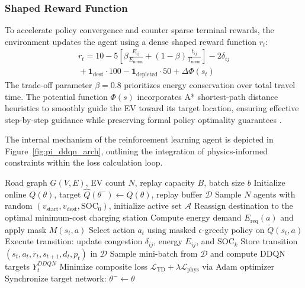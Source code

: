 \documentclass[conference]{IEEEtran}
\begin{document}
\subsubsection{Shaped Reward Function}
To accelerate policy convergence and counter sparse terminal rewards, the environment updates the agent using a dense shaped reward function $r_t$:
\begin{equation}
\begin{aligned}
r_t = 10 - 5\left[\beta\frac{E_{ij}}{E_{\text{norm}}} + (1-\beta)\frac{t_{ij}}{T_{\text{norm}}}\right] - 2\delta_{ij} \\
{} + \mathbf{1}_{\text{dest}}\cdot 100 - \mathbf{1}_{\text{depleted}}\cdot 50 + \Delta\Phi(s_t)
\end{aligned}
\label{eq:reward}
\end{equation}
The trade-off parameter $\beta = 0.8$ prioritizes energy conservation over total travel time. The potential function $\Phi(s)$ incorporates A* shortest-path distance heuristics to smoothly guide the EV toward its target location, ensuring effective step-by-step guidance while preserving formal policy optimality guarantees \cite{ng1999policy}.

The internal mechanism of the reinforcement learning agent is depicted in Figure~\ref{fig:pi_ddqn_arch}, outlining the integration of physics-informed constraints within the loss calculation loop.

\begin{algorithm}[ht]
\caption{Multi-Agent PI-DDQN Routing with Physics Masking}
\label{algo:piddqn_detailed}
\begin{algorithmic}[1]
\REQUIRE Road graph $G(V,E)$, EV count $N$, replay capacity $B$, batch size $b$
\STATE Initialize online $Q(\theta)$, target $\hat{Q}(\theta^-)\leftarrow Q(\theta)$, replay buffer $\mathcal{D}$
    \STATE Sample $N$ agents with random $(v_{\text{start}}, v_{\text{dest}}, \text{SOC}_0)$, initialize active set $\mathcal{A}$
                \STATE Reassign destination to the optimal minimum-cost charging station
            \ENDIF
            \STATE Compute energy demand $E_{\text{req}}(a)$ and apply mask $M(s_t, a)$
            \STATE Select action $a_t$ using masked $\epsilon$-greedy policy on $\tilde{Q}(s_t, a)$
            \STATE Execute transition: update congestion $\delta_{ij}$, energy $E_{ij}$, and $\text{SOC}_k$
            \STATE Store transition $(s_t,a_t,r_t,s_{t+1},d_t,p_t)$ in $\mathcal{D}$
        \ENDFOR
            \STATE Sample mini-batch from $\mathcal{D}$ and compute DDQN targets $Y_t^{DDQN}$
            \STATE Minimize composite loss $\mathcal{L}_{\text{TD}}+\lambda\mathcal{L}_{\text{phys}}$ via Adam optimizer
        \ENDIF
    \ENDFOR
        \STATE Synchronize target network: $\theta^{-}\leftarrow\theta$
    \ENDIF
\ENDFOR
\end{algorithmic}
\end{algorithm}
\end{document}
